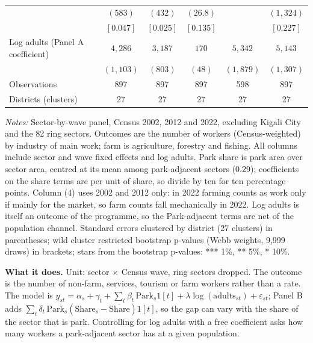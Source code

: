 \documentclass[11pt]{article}
\begin{document}
\begin{table}[H]
\begin{tabular}{lccccc}
 & $(583)$ & $(432)$ & $(26.8)$ &  & $(1,324)$ \\
 & $[0.047]$ & $[0.025]$ & $[0.135]$ &  & $[0.227]$ \\
\midrule
Log adults (Panel A coefficient) & $4,286$ & $3,187$ & $170$ & $5,342$ & $5,143$ \\
 & $(1,103)$ & $(803)$ & $(48)$ & $(1,879)$ & $(1,307)$ \\
Observations & 897 & 897 & 897 & 598 & 897 \\
Districts (clusters) & 27 & 27 & 27 & 27 & 27 \\
\bottomrule
\end{tabular}
\begin{minipage}{0.95\textwidth}\footnotesize
\textit{Notes:} Sector-by-wave panel, Census 2002, 2012 and 2022, excluding Kigali City and the 82 ring sectors. Outcomes are the number of workers (Census-weighted) by industry of main work; farm is agriculture, forestry and fishing. All columns include sector and wave fixed effects and log adults. Park share is park area over sector area, centred at its mean among park-adjacent sectors (0.29); coefficients on the share terms are per unit of share, so divide by ten for ten percentage points. Column (4) uses 2002 and 2012 only: in 2022 farming counts as work only if mainly for the market, so farm counts fall mechanically in 2022. Log adults is itself an outcome of the programme, so the Park-adjacent terms are net of the population channel. Standard errors clustered by district (27 clusters) in parentheses; wild cluster restricted bootstrap p-values (Webb weights, 9,999 draws) in brackets; stars from the bootstrap p-values: *** 1\%, ** 5\%, * 10\%.
\end{minipage}
\end{table}
\textbf{What it does.} Unit: sector $\times$ Census wave, ring sectors dropped. The outcome is the number of non-farm, services, tourism or farm workers rather than a rate. The model is $y_{st} = \alpha_s + \gamma_t + \sum_t \beta_t\,\mathrm{Park}_s 1[t] + \lambda \log(\mathrm{adults}_{st}) + \varepsilon_{st}$; Panel B adds $\sum_t \delta_t\,\mathrm{Park}_s(\mathrm{Share}_s - \overline{\mathrm{Share}})1[t]$, so the gap can vary with the share of the sector that is park. Controlling for log adults with a free coefficient asks how many workers a park-adjacent sector has at a given population.
\end{document}
